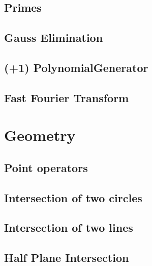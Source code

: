 \documentclass[10pt,twocolumn,oneside]{article}
\begin{document}
\subsection{Primes}


\subsection{Gauss Elimination}


\subsection{(+1) PolynomialGenerator}


\subsection{Fast Fourier Transform}


\section{Geometry}
\subsection{Point operators}


\subsection{Intersection of two circles}


\subsection{Intersection of two lines}


\subsection{Half Plane Intersection}

\end{document}
